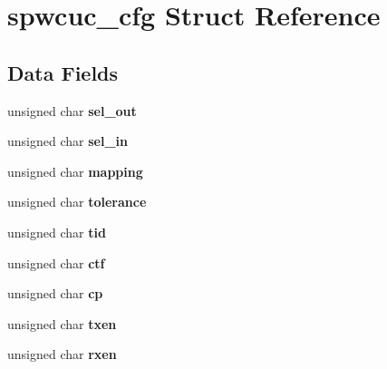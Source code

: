 \hypertarget{structspwcuc__cfg}{}\section{spwcuc\+\_\+cfg Struct Reference}
\label{structspwcuc__cfg}
\subsection*{Data Fields}
\begin{DoxyCompactItemize}
\item 
\mbox{\label{structspwcuc__cfg_a0496eebb2d8acb06d7aa899759fce2ec}} 
unsigned char {\bfseries sel\+\_\+out}
\item 
\mbox{\label{structspwcuc__cfg_a5ce1b2fd68e25c74b3c2607ea41a1ab5}} 
unsigned char {\bfseries sel\+\_\+in}
\item 
\mbox{\label{structspwcuc__cfg_a75681e09fb66855e4618b6d2a0ede7d9}} 
unsigned char {\bfseries mapping}
\item 
\mbox{\label{structspwcuc__cfg_a8560c798af0e1cab4480547f698ef5a8}} 
unsigned char {\bfseries tolerance}
\item 
\mbox{\label{structspwcuc__cfg_a40601d0cc09f9b0e8317916f0e35ce52}} 
unsigned char {\bfseries tid}
\item 
\mbox{\label{structspwcuc__cfg_a49800cc88aa81cbfe5dd4912bf739ed8}} 
unsigned char {\bfseries ctf}
\item 
\mbox{\label{structspwcuc__cfg_a5090e7a2086de463d47ef8cd92528784}} 
unsigned char {\bfseries cp}
\item 
\mbox{\label{structspwcuc__cfg_a920a8755b57305c8aebb15c4997f3313}} 
unsigned char {\bfseries txen}
\item 
\mbox{\label{structspwcuc__cfg_acfc2e1ece267e71945a8c9a716428bee}} 
unsigned char {\bfseries rxen}
\item 
\mbox{\label{structspwcuc__cfg_ad4484282950dc64c99d0d7b407d80b68}} 

\end{DoxyCompactItemize}
